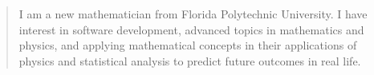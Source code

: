 \documentclass[10pt,a4paper,ragged2e,withhyper]{altacv}
\begin{document}
\begin{paracol}{2}

            
        
        
        
        
        
        \newpage
        
        \switchcolumn
        
            \begin{quote}
                I am a new mathematician from Florida 
                Polytechnic University. 
                I have interest in software development,
                advanced topics in mathematics and physics,
                and applying mathematical concepts in their applications
                of physics and statistical analysis to predict future outcomes
                in real life.
            \end{quote}
        

\end{paracol}
\end{document}
